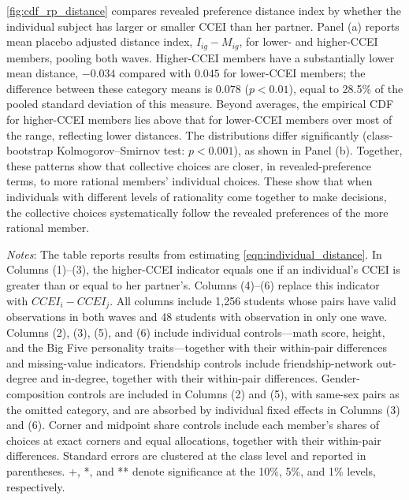 \documentclass[11 pt]{article}
\begin{document}
\autoref{fig:cdf_rp_distance} compares revealed preference distance index by whether the individual subject has larger or smaller CCEI than her partner. Panel (a) reports mean placebo adjusted distance index, $I_{ig}-M_{ig}$, for lower- and higher-CCEI members, pooling both waves. Higher-CCEI members have a substantially lower mean distance, $-0.034$ compared with $0.045$ for lower-CCEI members; the difference between these category means is $0.078$ ($p<0.01$), equal to 28.5\% of the pooled standard deviation of this measure. Beyond averages, the empirical CDF for higher-CCEI members lies above that for lower-CCEI members over most of the range, reflecting lower distances. The distributions differ significantly (class-bootstrap Kolmogorov--Smirnov test: $p<0.001$), as shown in Panel (b). Together, these patterns show that collective choices are closer, in revealed-preference terms, to more rational members' individual choices. These show that when individuals with different levels of rationality come together to make decisions, the collective choices systematically follow the revealed preferences  of the more rational member.

\begin{table}[h!]
\centering
\caption{Individual Rationality and Revealed-Preference Distance}
\label{tab:pref_agg_ccei}
\begin{minipage}{\textwidth}
{\footnotesize \emph{Notes}: The table reports results from estimating \autoref{eqn:individual_distance}. In Columns (1)--(3), the higher-CCEI indicator equals one if an individual's CCEI is greater than or equal to her partner's. Columns (4)--(6) replace this indicator with $CCEI_i-CCEI_j$. All columns include 1,256 students whose pairs have valid observations in both waves and 48 students with observation in only one wave. Columns (2), (3), (5), and (6) include individual controls—math score, height, and the Big Five personality traits—together with their within-pair differences and missing-value indicators. Friendship controls include friendship-network out-degree and in-degree, together with their within-pair differences. Gender-composition controls are included in Columns (2) and (5), with same-sex pairs as the omitted category, and are absorbed by individual fixed effects in Columns (3) and (6). Corner and midpoint share controls include each member's shares of choices at exact corners and equal allocations, together with their within-pair differences. Standard errors are clustered at the class level and reported in parentheses. +, *, and ** denote significance at the 10\%, 5\%, and 1\% levels, respectively.}
\end{minipage}
\end{table}
\end{document}
